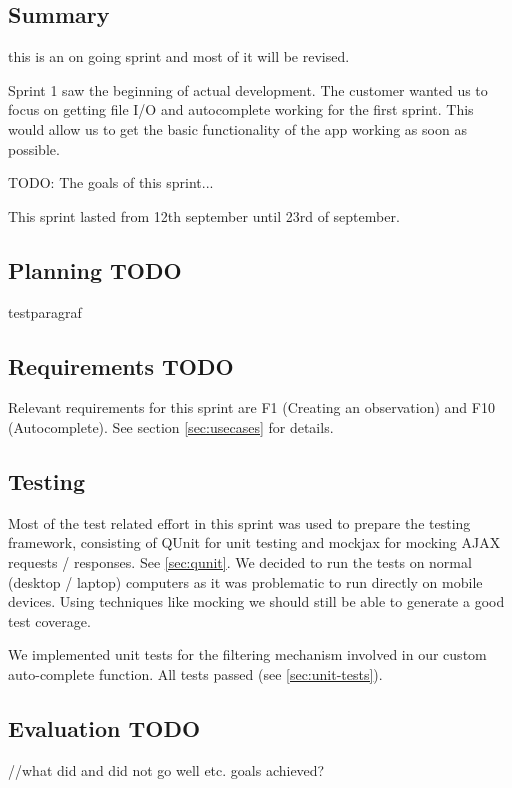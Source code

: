 \subsection{Summary}

this is an on going sprint and most of it will be revised.

	Sprint 1 saw the beginning of actual development. The customer wanted us to focus on getting file I/O and autocomplete working for the first sprint. This would allow us to get the basic functionality of the app working as soon as possible.
	
	TODO:
	The goals of this sprint...

	This sprint lasted from 12th september until 23rd of september.

\subsection{Planning TODO}
	
	testparagraf

	
\subsection{Requirements TODO}

	Relevant requirements for this sprint are F1 (Creating an observation) and F10 (Autocomplete). See section \ref{sec:usecases} for details.


\subsection{Testing}

	Most of the test related effort in this sprint was used to prepare the
	testing framework, consisting of QUnit for unit testing and mockjax for
	mocking AJAX requests / responses. See \ref{sec:qunit}. We decided to run
	the tests on normal (desktop / laptop) computers as it was problematic to
	run directly on mobile devices. Using techniques like mocking we should
	still be able to generate a good test coverage.

	We implemented unit tests for the filtering mechanism involved in our custom
	auto-complete function. All tests passed (see \ref{sec:unit-tests}).

\subsection{Evaluation TODO}
	//what did and did not go well etc. goals achieved?
